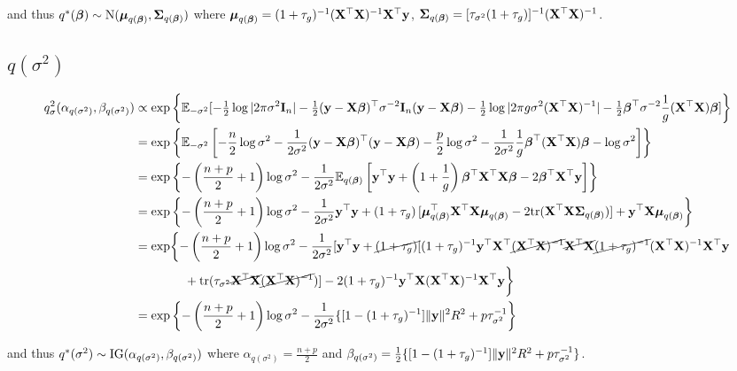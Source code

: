 \documentclass{amsart}[12pt]
\begin{document}
and thus
$q^*({\boldsymbol \beta}) \sim \text{N} ({\boldsymbol \mu}_{q({\boldsymbol \beta})}, {\boldsymbol \Sigma}_{q({\boldsymbol \beta})} )$
where ${\boldsymbol \mu}_{q({\boldsymbol \beta})} = (1 + \tau_g)^{-1} ({\bf X}^\top {\bf X})^{-1} {\bf X}^\top {\bf y}$,
${\boldsymbol \Sigma}_{q({\boldsymbol \beta})} = [\tau_{\sigma^2}(1 + \tau_{g})]^{-1}({\bf X}^\top {\bf X})^{-1}$.

\subsection{$q(\sigma^2)$}
\begin{align*}
q_\sigma^2(\alpha_{q(\sigma^2)}, \beta_{q(\sigma^2)}) &\propto \exp \left \{ \mathbb{E}_{-\sigma^2} [-\tfrac{1}{2} \log |2 \pi \sigma^2 {\bf I}_n| - \tfrac{1}{2} ({\bf y} - {\bf X} {\boldsymbol \beta})^\top \sigma^{-2} {\bf I}_n ({\bf y} - {\bf X} {\boldsymbol \beta}) - \tfrac{1}{2} \log |2 \pi g \sigma^2 ({\bf X}^\top {\bf X})^{-1}| - \tfrac{1}{2} {\boldsymbol \beta}^\top \sigma^{-2} \frac{1}{g} ({\bf X}^\top {\bf X}) {\boldsymbol \beta}] \right \} \\
&=  \exp \left \{ \mathbb{E}_{-\sigma^2} \left[- \frac{n}{2} \log \sigma^2 - \frac{1}{2 \sigma^2}({\bf y} - {\bf X} {\boldsymbol \beta})^\top({\bf y} - {\bf X} {\boldsymbol \beta}) - \frac{p}{2} \log \sigma^2 - \frac{1}{2 \sigma^2} \frac{1}{g} {\boldsymbol \beta}^\top ({\bf X}^\top {\bf X}) {\boldsymbol \beta} - \log \sigma^2\right] \right \} \\
&=  \exp \left \{ {-\left(\frac{n + p}{2} + 1\right) \log \sigma^2 -  \frac{1}{2 \sigma^2} \mathbb{E}_{q({\boldsymbol \beta})} \left[ {\bf y}^\top {\bf y} + \left(1 + \frac{1}{g} \right) {\boldsymbol \beta}^\top {\bf X}^\top {\bf X} {\boldsymbol\beta} - 2 {\boldsymbol \beta}^\top {\bf X}^\top {\bf y} \right]}  \right \}\\
&=  \exp \left \{ -\left(\frac{n + p}{2} + 1 \right)\log \sigma^2 - \frac{1}{2 \sigma^2} {\bf y}^\top{\bf y} + \left( 1 + \tau_g \right) [{\boldsymbol \mu}_{q({\boldsymbol \beta})}^\top {\bf X}^\top {\bf X} {\boldsymbol\mu}_{q({\boldsymbol \beta})} - 2 \text{tr}({\bf X}^\top {\bf X} {\boldsymbol\Sigma}_{q({\boldsymbol \beta})})] + {\bf y}^\top {\bf X} {\boldsymbol\mu}_{q({\boldsymbol \beta})} \right \} \\
&=  \exp \biggl \{ -\left(\frac{n + p}{2} + 1\right) \log \sigma^2 - \frac{1}{2 \sigma^2} [ {\bf y}^\top{\bf y} +  \cancel{(1 + \tau_g)}[(1 + \tau_g)^{-1} {\bf y}^\top {\bf X}^\top \cancel{({\bf X}^\top {\bf X})^{-1}}  \cancel{{\bf X}^\top {\bf X}} \cancel{(1 + \tau_g)^{-1}} ({\bf X}^\top {\bf X})^{-1} {\bf X}^\top {\bf y} \\
&\quad \quad \qquad + \text{tr}{(\tau_{\sigma^2} \cancel{{\bf X}^\top {\bf X}} \cancel{({\bf X}^\top {\bf X})^{-1}})}] - 2 (1 + \tau_g)^{-1} {\bf y}^\top {\bf X} ({\bf X}^\top {\bf X})^{-1} {\bf X}^\top {\bf y} \biggl \} \\
&=  \exp \left \{ -\left(\frac{n + p}{2} + 1\right) \log \sigma^2 - \frac{1}{2 \sigma^2}\{ [1 - (1 + \tau_g)^{-1}]\|{\bf y}\|^2 R^2	+ p \tau_{\sigma^2}^{-1} \right \} 
\end{align*}

and thus $q^*(\sigma^2) \sim \text{IG}(\alpha_{q(\sigma^2)}, \beta_{q(\sigma^2)})$ where
$\alpha_{q(\sigma^2)} = \frac{n + p}{2}$ and $\beta_{q(\sigma^2)} = \frac{1}{2}\{ [1 - (1 + \tau_g)^{-1}]\|{\bf y}\|^2 R^2	+ p \tau_{\sigma^2}^{-1} \}$.
\end{document}
